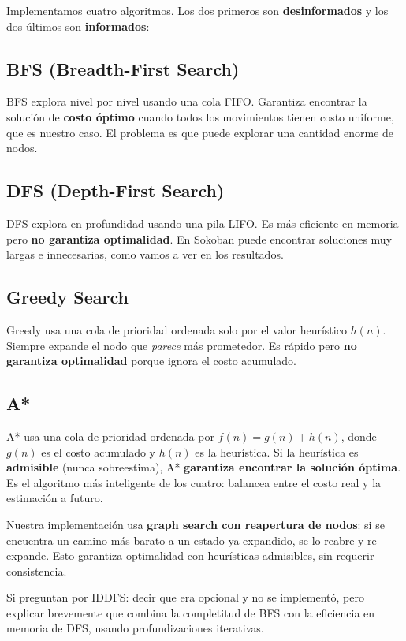 \documentclass[12pt, a4paper]{article}
\begin{document}
Implementamos cuatro algoritmos. Los dos primeros son \textbf{desinformados} y los dos últimos son \textbf{informados}:

\subsection{BFS (Breadth-First Search)}

BFS explora nivel por nivel usando una cola FIFO. Garantiza encontrar la solución de \textbf{costo óptimo} cuando todos los movimientos tienen costo uniforme, que es nuestro caso. El problema es que puede explorar una cantidad enorme de nodos.

\subsection{DFS (Depth-First Search)}

DFS explora en profundidad usando una pila LIFO. Es más eficiente en memoria pero \textbf{no garantiza optimalidad}. En Sokoban puede encontrar soluciones muy largas e innecesarias, como vamos a ver en los resultados.

\subsection{Greedy Search}

Greedy usa una cola de prioridad ordenada solo por el valor heurístico $h(n)$. Siempre expande el nodo que \textit{parece} más prometedor. Es rápido pero \textbf{no garantiza optimalidad} porque ignora el costo acumulado.

\subsection{A*}

A* usa una cola de prioridad ordenada por $f(n) = g(n) + h(n)$, donde $g(n)$ es el costo acumulado y $h(n)$ es la heurística. Si la heurística es \textbf{admisible} (nunca sobreestima), A* \textbf{garantiza encontrar la solución óptima}. Es el algoritmo más inteligente de los cuatro: balancea entre el costo real y la estimación a futuro.

Nuestra implementación usa \textbf{graph search con reapertura de nodos}: si se encuentra un camino más barato a un estado ya expandido, se lo reabre y re-expande. Esto garantiza optimalidad con heurísticas admisibles, sin requerir consistencia.

\begin{notapresentador}
Si preguntan por IDDFS: decir que era opcional y no se implementó, pero explicar brevemente que combina la completitud de BFS con la eficiencia en memoria de DFS, usando profundizaciones iterativas.
\end{notapresentador}
\end{document}
